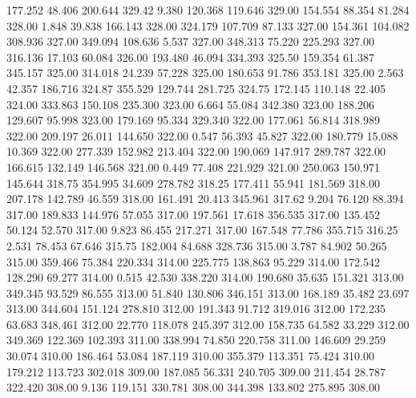  177.252   48.406  200.644       329.42
   9.380  120.368  119.646       329.00
 154.554   88.354   81.284       328.00
   1.848   39.838  166.143       328.00
 324.179  107.709   87.133       327.00
 154.361  104.082  308.936       327.00
 349.094  108.636    5.537       327.00
 348.313   75.220  225.293       327.00
 316.136   17.103   60.084       326.00
 193.480   46.094  334.393       325.50
 159.354   61.387  345.157       325.00
 314.018   24.239   57.228       325.00
 180.653   91.786  353.181       325.00
   2.563   42.357  186.716       324.87
 355.529  129.744  281.725       324.75
 172.145  110.148   22.405       324.00
 333.863  150.108  235.300       323.00
   6.664   55.084  342.380       323.00
 188.206  129.607   95.998       323.00
 179.169   95.334  329.340       322.00
 177.061   56.814  318.989       322.00
 209.197   26.011  144.650       322.00
   0.547   56.393   45.827       322.00
 180.779   15.088   10.369       322.00
 277.339  152.982  213.404       322.00
 190.069  147.917  289.787       322.00
 166.615  132.149  146.568       321.00
   0.449   77.408  221.929       321.00
 250.063  150.971  145.644       318.75
 354.995   34.609  278.782       318.25
 177.411   55.941  181.569       318.00
 207.178  142.789   46.559       318.00
 161.491   20.413  345.961       317.62
   9.204   76.120   88.394       317.00
 189.833  144.976   57.055       317.00
 197.561   17.618  356.535       317.00
 135.452   50.124   52.570       317.00
   9.823   86.455  217.271       317.00
 167.548   77.786  355.715       316.25
   2.531   78.453   67.646       315.75
 182.004   84.688  328.736       315.00
   3.787   84.902   50.265       315.00
 359.466   75.384  220.334       314.00
 225.775  138.863   95.229       314.00
 172.542  128.290   69.277       314.00
   0.515   42.530  338.220       314.00
 190.680   35.635  151.321       313.00
 349.345   93.529   86.555       313.00
  51.840  130.806  346.151       313.00
 168.189   35.482   23.697       313.00
 344.604  151.124  278.810       312.00
 191.343   91.712  319.016       312.00
 172.235   63.683  348.461       312.00
  22.770  118.078  245.397       312.00
 158.735   64.582   33.229       312.00
 349.369  122.369  102.393       311.00
 338.994   74.850  220.758       311.00
 146.609   29.259   30.074       310.00
 186.464   53.084  187.119       310.00
 355.379  113.351   75.424       310.00
 179.212  113.723  302.018       309.00
 187.085   56.331  240.705       309.00
 211.454   28.787  322.420       308.00
   9.136  119.151  330.781       308.00
 344.398  133.802  275.895       308.00
